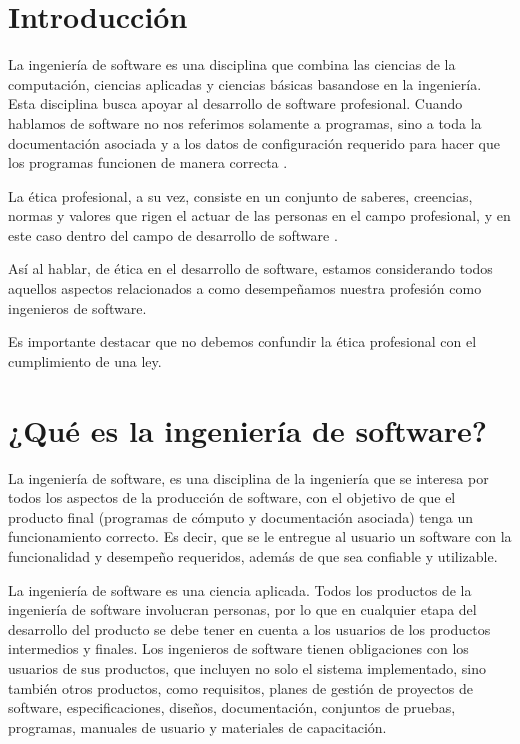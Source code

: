 \documentclass[twoside]{article}
\begin{document}
\begin{multicols}{2} %

\section{Introducción}

La ingeniería de software es una disciplina que combina las ciencias de la
computación, ciencias aplicadas y ciencias básicas basandose en la ingeniería.
Esta disciplina busca apoyar al desarrollo de software profesional. Cuando
hablamos de software no nos referimos solamente a programas, sino a toda la
documentación  asociada y a los datos de configuración requerido para hacer que
los programas funcionen de manera correcta \cite{sommerville2005ingenieria}.

La ética profesional, a su vez, consiste en un conjunto de saberes, creencias,
normas y valores que rigen el actuar de las personas en el campo profesional, y
en este caso dentro del campo de desarrollo de software
\cite{yuren2013etica}.

Así al hablar, de ética en el desarrollo de software, estamos considerando todos
aquellos aspectos relacionados a como desempeñamos nuestra profesión como
ingenieros de software.

Es importante destacar que no debemos confundir la ética profesional con el
cumplimiento de una ley.

\section{¿Qué es la ingeniería de software?}

La ingeniería de software, es una disciplina de la ingeniería que se interesa
por todos los aspectos de la producción de software, con el objetivo de que el
producto final (programas de cómputo y documentación asociada) tenga un
funcionamiento correcto. Es decir, que se le entregue al usuario un software con
la funcionalidad y desempeño requeridos, además de que sea confiable y
utilizable.

La ingeniería de software es una ciencia aplicada. Todos los productos de la
ingeniería de software involucran personas, por lo que en cualquier etapa del
desarrollo del producto se debe tener en cuenta a los usuarios de los productos
intermedios y finales. Los ingenieros de software tienen obligaciones con los
usuarios de sus productos, que incluyen no solo el sistema implementado, sino
también otros productos, como requisitos, planes de gestión de proyectos de
software, especificaciones, diseños, documentación, conjuntos de pruebas,
programas, manuales de usuario y materiales de capacitación.


\end{multicols}
\end{document}
